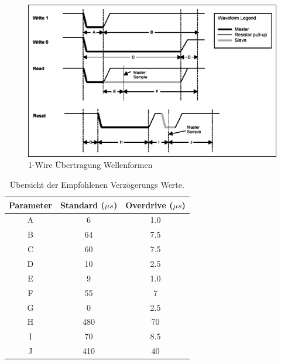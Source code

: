 \begin{figure}[H]
    \centering
    \includegraphics[width=1\textwidth]{resources/images/onewire.png}
    \caption[1-Wire Beispiel]{1-Wire Übertragung Wellenformen \cite{1wire}}
    \label{fig:1w}
\end{figure}

\renewcommand{\arraystretch}{1}
\begin{table}[H]
    \centering
    \begin{tabular}{|c|c|c|}
        \hline
        \textbf{Parameter} & \textbf{Standard (\(\mu s\))} & \textbf{Overdrive (\(\mu s\))} \\
        \hline
        A                  & 6                             & 1.0                            \\
        B                  & 64                            & 7.5                            \\
        C                  & 60                            & 7.5                            \\
        D                  & 10                            & 2.5                            \\
        E                  & 9                             & 1.0                            \\
        F                  & 55                            & 7                              \\
        G                  & 0                             & 2.5                            \\
        H                  & 480                           & 70                             \\
        I                  & 70                            & 8.5                            \\
        J                  & 410                           & 40                             \\
        \hline
    \end{tabular}
    \caption{Übersicht der Empfohlenen Verzögerungs Werte.}
    \label{tab:standard_overdrive}
\end{table}

